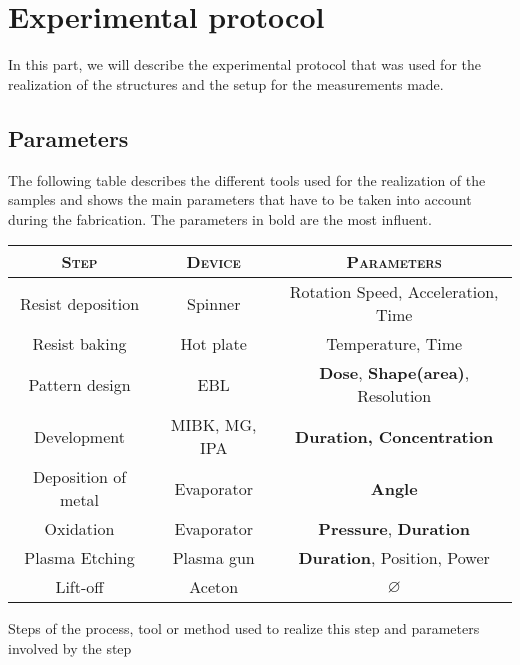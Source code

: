 \pagestyle{fancy}
\chapter{Experimental protocol}
\label{Chap3}

In this part, we will describe the experimental protocol that was used for the realization of the structures and the setup for the measurements made.

    \section{Parameters}
    
        The following table describes the different tools used for the realization of the samples and shows the main parameters that have to be taken into account during the fabrication. The parameters in bold are the most influent.
        
       \vspace{0.5cm}
        \begin{graphe} 
        \centering
        \begin{tabular}{|c|c|c|}
        \hline
        \textsc{Step}&\textsc{Device}&\textsc{Parameters}\\
        \hline
        Resist deposition&Spinner&Rotation Speed, Acceleration, Time\\
        \hline
        Resist baking&Hot plate&Temperature, Time\\
        \hline
        Pattern design&EBL&\textbf{Dose}, \textbf{Shape(area)}, Resolution\\
        \hline
        Development&MIBK, MG, IPA&\textbf{Duration, Concentration}\\ 
        \hline
        Deposition of metal&Evaporator&\textbf{Angle}\\
        \hline
        Oxidation&Evaporator&\textbf{Pressure}, \textbf{Duration}\\
        \hline
        Plasma Etching&Plasma gun&\textbf{Duration}, Position, Power\\
        \hline
        Lift-off&Aceton&$\varnothing$ \\
        \hline
        
        \end{tabular}
        \caption{Steps of the process, tool or method used to realize this step and parameters involved by the step}
        \end{graphe}
        \vspace{0.5cm}
        
